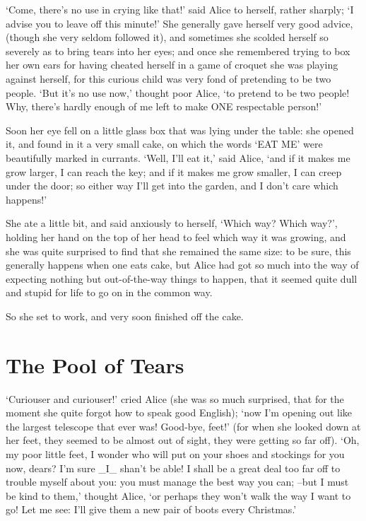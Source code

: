 \documentclass[12pt]{book}
\begin{document}
  `Come, there's no use in crying like that!' said Alice to
herself, rather sharply; `I advise you to leave off this minute!'
She generally gave herself very good advice, (though she very
seldom followed it), and sometimes she scolded herself so
severely as to bring tears into her eyes; and once she remembered
trying to box her own ears for having cheated herself in a game
of croquet she was playing against herself, for this curious
child was very fond of pretending to be two people.  `But it's no
use now,' thought poor Alice, `to pretend to be two people!  Why,
there's hardly enough of me left to make ONE respectable
person!'

  Soon her eye fell on a little glass box that was lying under
the table:  she opened it, and found in it a very small cake, on
which the words `EAT ME' were beautifully marked in currants.
`Well, I'll eat it,' said Alice, `and if it makes me grow larger,
I can reach the key; and if it makes me grow smaller, I can creep
under the door; so either way I'll get into the garden, and I
don't care which happens!'

  She ate a little bit, and said anxiously to herself, `Which
way?  Which way?', holding her hand on the top of her head to
feel which way it was growing, and she was quite surprised to
find that she remained the same size:  to be sure, this generally
happens when one eats cake, but Alice had got so much into the
way of expecting nothing but out-of-the-way things to happen,
that it seemed quite dull and stupid for life to go on in the
common way.

  So she set to work, and very soon finished off the cake.

\chapter{The Pool of Tears}

  `Curiouser and curiouser!' cried Alice (she was so much
surprised, that for the moment she quite forgot how to speak good
English); `now I'm opening out like the largest telescope that
ever was!  Good-bye, feet!' (for when she looked down at her
feet, they seemed to be almost out of sight, they were getting so
far off).  `Oh, my poor little feet, I wonder who will put on
your shoes and stockings for you now, dears?  I'm sure \_I\_ shan't
be able!  I shall be a great deal too far off to trouble myself
about you:  you must manage the best way you can; --but I must be
kind to them,' thought Alice, `or perhaps they won't walk the
way I want to go!  Let me see:  I'll give them a new pair of
boots every Christmas.'
\end{document}
